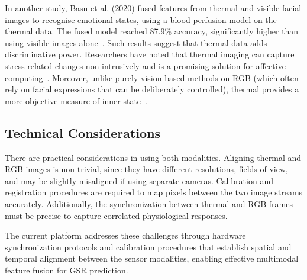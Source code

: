 In another study, Basu et al. (2020) fused features from thermal and visible facial images to recognise emotional states, using a blood perfusion model on the thermal data. The fused model reached 87.9\% accuracy, significantly higher than using visible images alone~\cite{zhang2021human}. Such results suggest that thermal data adds discriminative power. Researchers have noted that thermal imaging can capture stress-related changes non-intrusively and is a promising solution for affective computing~\cite{mdpi2020applied}. Moreover, unlike purely vision-based methods on RGB (which often rely on facial expressions that can be deliberately controlled), thermal provides a more objective measure of inner state~\cite{zhang2021human}.

\subsection{Technical Considerations}

There are practical considerations in using both modalities. Aligning thermal and RGB images is non-trivial, since they have different resolutions, fields of view, and may be slightly misaligned if using separate cameras. Calibration and registration procedures are required to map pixels between the two image streams accurately. Additionally, the synchronization between thermal and RGB frames must be precise to capture correlated physiological responses.

The current platform addresses these challenges through hardware synchronization protocols and calibration procedures that establish spatial and temporal alignment between the sensor modalities, enabling effective multimodal feature fusion for GSR prediction.
